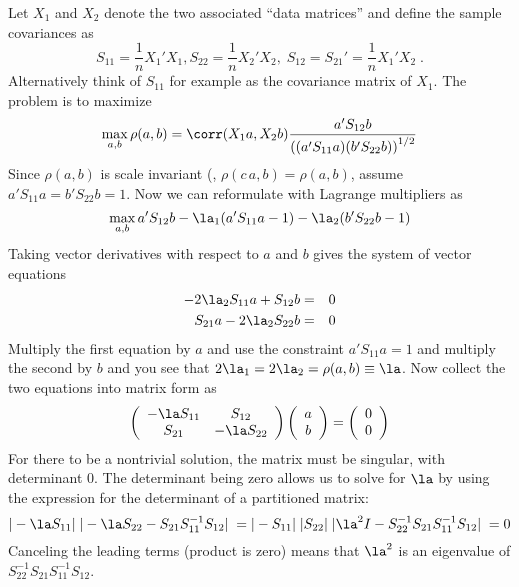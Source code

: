 \documentclass[12pt]{article}
\begin{document}
 Let $X_1$ and $X_2$ denote the two associated ``data matrices'' and define the
sample covariances as
 \begin{equation}
   S_{11} = \frac{1}{n} X_1'X_1, S_{22} = \frac{1}{n} X_2'X_2,
   \; S_{12} = S_{21}' = \frac{1}{n} X_1'X_2 \;.
 \label{eq:s11}
 \end{equation}
 Alternatively think of $S_{11}$ for example as the covariance matrix of $X_1$.
  The problem is to maximize
 \begin{equation}
    \max_{a,b} \rho(a,b)= \corr(X_1a, X_2b)
               \frac{a'S_{12}b}
                    {\left((a'S_{11}a)(b'S_{22}b)\right)^{1/2}}
 \label{eq:cancor}
 \end{equation}
 Since $\rho(a,b)$ is scale invariant (\ie, $\rho(c\,a,b) = \rho(a,b)$, assume
 $a'S_{11}a = b'S_{22}b = 1$.  Now we can reformulate with Lagrange multipliers
 as
 \begin{equation}
    \max_{a,b} a'S_{12}b - \la_1(a'S_{11}a-1) - \la_2 (b'S_{22}b-1)
 \label{eq:cca}
 \end{equation}
 Taking vector derivatives with respect to $a$ and $b$ gives the system of
 vector equations
 \begin{eqnarray*}
   -2\la_2 S_{11} a + S_{12} b &=& 0  \cr
   S_{21} a - 2\la_2 S_{22} b &=& 0
\end{eqnarray*}
 Multiply the first equation by $a$ and use the constraint $a'S_{11}a = 1$ and multiply the second by $b$ and you see that $ 2 \la_1 = 2 \la_2 = \rho(a,b) \equiv \la$.  Now collect the two equations into matrix form as
 \begin{displaymath}
   \left( \begin{array}{cc}
     -\la S_{11} & S_{12} \cr
            S_{21} & -\la S_{22} 
   \end{array} \right)
   \left( \begin{array}{c}  a \cr b \end{array} \right)
   = 
   \left( \begin{array}{c} 0 \cr 0 \end{array} \right)
 \end{displaymath}
 For there to be a nontrivial solution, the matrix must be singular, with
determinant 0. The determinant being zero allows us to solve for $\la$ by using the expression for the determinant of a partitioned matrix:
 \begin{displaymath}
    |-\la  S_{11}| \; |-\la S_{22} - S_{21}S_{11}^{-1}S_{12}| \;
    = 
    |-S_{11}| \; |S_{22}| \;|\la^2I - S_{22}^{-1}S_{21}S_{11}^{-1}S_{12}| \; = 0
 \end{displaymath}
 Canceling the leading terms (product is zero) means that $\la^2$ is an eigenvalue of 
  $S_{22}^{-1}S_{21}S_{11}^{-1}S_{12}$. 
\end{document}
